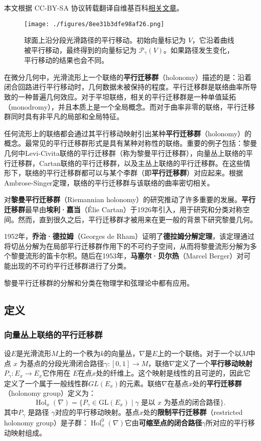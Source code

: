 
本文根据 CC-BY-SA 协议转载翻译自维基百科\href{https://en.wikipedia.org/wiki/Holonomy}{相关文章}。

\begin{figure}[ht]
\centering
\texttt{[image: ./figures/8ee31b3dfe98af26.png]}
\caption{球面上沿分段光滑路径的平行移动。初始向量标记为 \(V\)，它沿着曲线被平行移动，最终得到的向量标记为 \( \mathcal{P}_\gamma (V) \)。如果路径发生变化，平行移动的结果也会不同。} \label{fig_WZQ_1}
\end{figure}
在微分几何中，光滑流形上一个联络的\textbf{平行迁移群}（holonomy）描述的是：沿着闭合回路进行平行移动时，几何数据未被保持的程度。平行迁移群是联络曲率所导致的一种普遍几何效应。对于平坦联络，相关的平行迁移群是一种单值延拓（monodromy），并且本质上是一个全局概念。而对于曲率非零的联络，平行迁移群同时具有非平凡的局部和全局特征。

任何流形上的联络都会通过其平行移动映射引出某种\textbf{平行迁移群}（holonomy）的概念。最常见的平行迁移群形式是具有某种对称性的联络。重要的例子包括：黎曼几何中Levi-Civita联络的平行迁移群（称为黎曼平行迁移群），向量丛上联络的平行迁移群，Cartan联络的平行迁移群，以及主丛上联络的平行迁移群。在这些情形下，联络的平行迁移群都可以与某个李群（即\textbf{平行迁移群}）对应起来。根据Ambrose-Singer定理，联络的平行迁移群与该联络的曲率密切相关。

对\textbf{黎曼平行迁移群}（Riemannian holonomy）的研究推动了许多重要的发展。\textbf{平行迁移群}最早由\textbf{埃利·嘉当}（Élie Cartan）于1926年引入，用于研究和分类对称空间。然而，直到很久之后，平行迁移群才被用来在更一般的背景下研究黎曼几何。

1952年，\textbf{乔治·德拉姆}（Georges de Rham）证明了\textbf{德拉姆分解定理}，该定理通过将切丛分解为在局部平行迁移群作用下的不可约子空间，从而将黎曼流形分解为多个黎曼流形的笛卡尔积。随后在1953年，\textbf{马塞尔·贝尔热}（Marcel Berger）对可能出现的不可约平行迁移群进行了分类。

黎曼平行迁移群的分解和分类在物理学和弦理论中都有应用。
\subsection{定义} 
\subsubsection{向量丛上联络的平行迁移群}  
设\(E\)是光滑流形\(M\)上的一个秩为\(k\)的向量丛，\(\nabla\)是\(E\)上的一个联络。对于一个以\(M\)中点 \(x\) 为基点的分段光滑闭合路径\(\gamma : [0,1] \to M\)，联络\(\nabla\)定义了一个\textbf{平行移动映射}\(P_\gamma : E_x \to E_x\)它作用在 \(E\)在点\(x\)处的纤维上。这个映射是线性的且可逆的，因此它定义了一个属于一般线性群\(GL(E_x)\)的元素。联络\(\nabla\)在基点\(x\)处的\textbf{平行迁移群}（holonomy group）定义为：
\[
\operatorname{Hol}_x(\nabla) = \{P_\gamma \in \mathrm{GL}(E_x) \mid \gamma \text{ 是以 } x \text{ 为基点的闭合路径}\}.~
\]
其中\(P_\gamma\) 是路径 \(\gamma\)对应的平行移动映射。基点\(x\)处的\textbf{限制平行迁移群}（restricted holonomy group）是子群：\(\operatorname{Hol}_x^0(\nabla)\)它由\textbf{可缩至点的闭合路径}\(\gamma\)所对应的平行移动映射组成。